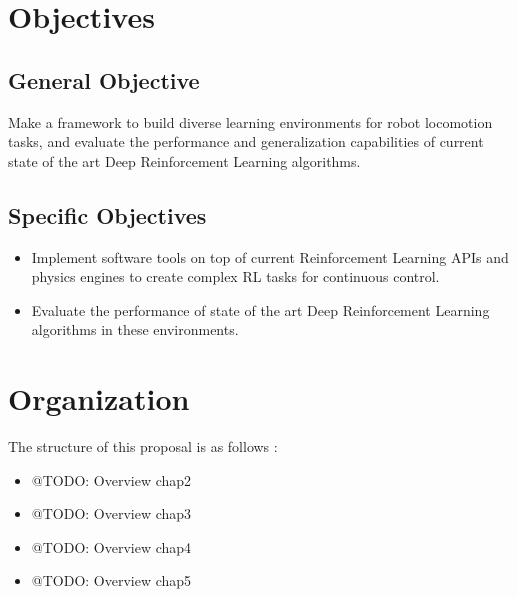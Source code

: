 \figEnvManipSimToreal

\section{Objectives}
\label{sec:objectives}

\subsection*{General Objective}
Make a framework to build diverse learning environments for robot locomotion tasks, and 
evaluate the performance and generalization capabilities of current state of the art Deep 
Reinforcement Learning algorithms.

\subsection*{Specific Objectives}
\begin{itemize}
 \item Implement software tools on top of current Reinforcement Learning APIs and physics engines 
       to create complex RL tasks for continuous control.
 \item Evaluate the performance of state of the art Deep Reinforcement Learning algorithms in these environments.
\end{itemize}

\figEnvironmentsProposalFromTo

\section{Organization}
\label{sec:organization}

The structure of this proposal is as follows :

\begin{itemize}
	\item @TODO: Overview chap2
	\item @TODO: Overview chap3
	\item @TODO: Overview chap4
	\item @TODO: Overview chap5
\end{itemize}